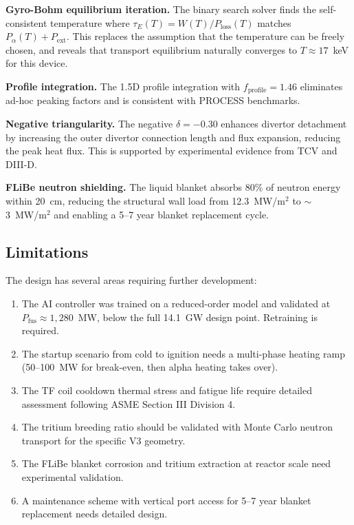 \documentclass[11pt,a4paper]{article}
\begin{document}
\textbf{Gyro-Bohm equilibrium iteration.} The binary search solver finds the self-consistent temperature where $\tau_E(T) = W(T)/P_{\text{loss}}(T)$ matches $P_\alpha(T) + P_{\text{ext}}$. This replaces the assumption that the temperature can be freely chosen, and reveals that transport equilibrium naturally converges to $T \approx 17$~keV for this device.

\textbf{Profile integration.} The 1.5D profile integration with $f_{\text{profile}} = 1.46$ eliminates ad-hoc peaking factors and is consistent with PROCESS benchmarks.

\textbf{Negative triangularity.} The negative $\delta = -0.30$ enhances divertor detachment by increasing the outer divertor connection length and flux expansion, reducing the peak heat flux. This is supported by experimental evidence from TCV and DIII-D.

\textbf{FLiBe neutron shielding.} The liquid blanket absorbs 80\% of neutron energy within 20~cm, reducing the structural wall load from 12.3~MW/m$^2$ to $\sim$3~MW/m$^2$ and enabling a 5--7 year blanket replacement cycle.

\subsection{Limitations}

The design has several areas requiring further development:

\begin{enumerate}[nosep]
    \item The AI controller was trained on a reduced-order model and validated at $P_{\text{fus}} \approx 1,280$~MW, below the full 14.1~GW design point. Retraining is required.
    \item The startup scenario from cold to ignition needs a multi-phase heating ramp (50--100~MW for break-even, then alpha heating takes over).
    \item The TF coil cooldown thermal stress and fatigue life require detailed assessment following ASME Section III Division 4.
    \item The tritium breeding ratio should be validated with Monte Carlo neutron transport for the specific V3 geometry.
    \item The FLiBe blanket corrosion and tritium extraction at reactor scale need experimental validation.
    \item A maintenance scheme with vertical port access for 5--7 year blanket replacement needs detailed design.
\end{enumerate}
\end{document}
